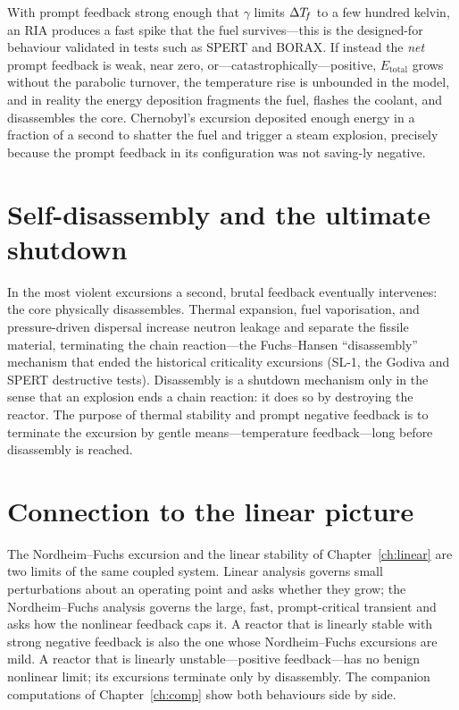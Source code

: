 \begin{example}
With prompt feedback strong enough that $\gamma$ limits $\Delta T_{\!f}$ to a few
hundred kelvin, an RIA produces a fast spike that the fuel survives---this is the
designed-for behaviour validated in tests such as SPERT and BORAX. If instead the
\emph{net} prompt feedback is weak, near zero, or---catastrophically---positive,
$E_{\text{total}}$ grows without the parabolic turnover, the temperature rise is
unbounded in the model, and in reality the energy deposition fragments the fuel,
flashes the coolant, and disassembles the core. Chernobyl's excursion deposited
enough energy in a fraction of a second to shatter the fuel and trigger a steam
explosion, precisely because the prompt feedback in its configuration was not
saving-ly negative.
\end{example}

\section{Self-disassembly and the ultimate shutdown}

In the most violent excursions a second, brutal feedback eventually intervenes:
the core physically disassembles. Thermal expansion, fuel vaporisation, and
pressure-driven dispersal increase neutron leakage and separate the fissile
material, terminating the chain reaction---the Fuchs--Hansen ``disassembly''
mechanism that ended the historical criticality excursions (SL-1, the Godiva and
SPERT destructive tests). Disassembly is a shutdown mechanism only in the sense
that an explosion ends a chain reaction: it does so by destroying the reactor. The
purpose of thermal stability and prompt negative feedback is to terminate the
excursion by gentle means---temperature feedback---long before disassembly is
reached.

\section{Connection to the linear picture}

The Nordheim--Fuchs excursion and the linear stability of Chapter~\ref{ch:linear}
are two limits of the same coupled system. Linear analysis governs small
perturbations about an operating point and asks whether they grow; the
Nordheim--Fuchs analysis governs the large, fast, prompt-critical transient and
asks how the nonlinear feedback caps it. A reactor that is linearly stable with
strong negative feedback is also the one whose Nordheim--Fuchs excursions are
mild. A reactor that is linearly unstable---positive feedback---has no benign
nonlinear limit; its excursions terminate only by disassembly. The companion
computations of Chapter~\ref{ch:comp} show both behaviours side by side.

